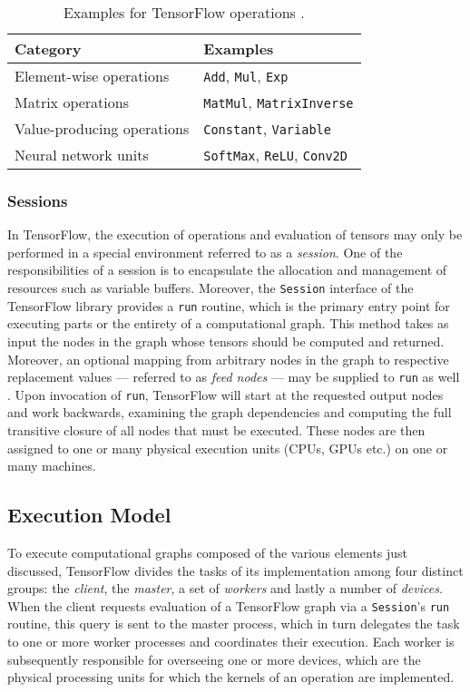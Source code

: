 \begin{table}[t!]
  \begin{tabular}{ll}
    \textbf{Category} & \textbf{Examples}
    \\ \toprule
    Element-wise operations & \texttt{Add}, \texttt{Mul}, \texttt{Exp}
    \\
    Matrix operations & \texttt{MatMul}, \texttt{MatrixInverse}
    \\
    Value-producing operations & \texttt{Constant}, \texttt{Variable}
    \\
    Neural network units & \texttt{SoftMax}, \texttt{ReLU}, \texttt{Conv2D}
    \\ \bottomrule
    \end{tabular}
    \caption{Examples for TensorFlow operations \cite{tensorflow}.}
    \label{tab:ops}
\end{table}

\subsubsection{Sessions}\label{sec:model-graphs-sessions}

In TensorFlow, the execution of operations and evaluation of tensors may only be
performed in a special environment referred to as a \emph{session}. One of the
responsibilities of a session is to encapsulate the allocation and management of
resources such as variable buffers. Moreover, the \texttt{Session} interface of
the TensorFlow library provides a \texttt{run} routine, which is the primary
entry point for executing parts or the entirety of a computational graph. This
method takes as input the nodes in the graph whose tensors should be computed
and returned. Moreover, an optional mapping from arbitrary nodes in the graph to
respective replacement values --- referred to as \emph{feed nodes} --- may be
supplied to \texttt{run} as well \cite{tensorflow}. Upon invocation of
\texttt{run}, TensorFlow will start at the requested output nodes and work
backwards, examining the graph dependencies and computing the full transitive
closure of all nodes that must be executed. These nodes are then assigned to one
or many physical execution units (CPUs, GPUs etc.) on one or many machines.

\subsection{Execution Model}\label{sec:model-exec}

To execute computational graphs composed of the various elements just discussed,
TensorFlow divides the tasks of its implementation among four distinct groups:
the \emph{client}, the \emph{master}, a set of \emph{workers} and lastly a
number of \emph{devices}. When the client requests evaluation of a TensorFlow
graph via a \texttt{Session}'s \texttt{run} routine, this query is sent to the
master process, which in turn delegates the task to one or more worker processes
and coordinates their execution. Each worker is subsequently responsible for
overseeing one or more devices, which are the physical processing units for
which the kernels of an operation are implemented.

